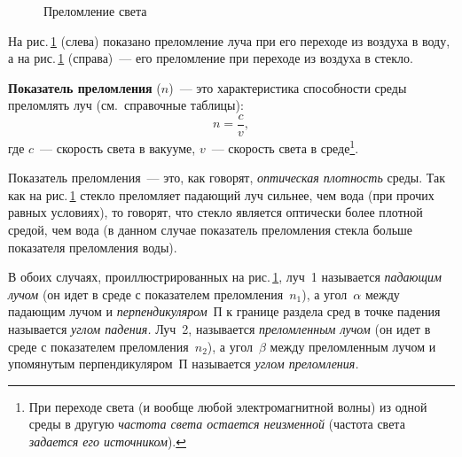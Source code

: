 \documentclass[main.tex]{subfiles}
\begin{document}
\begin{figure}[H]
\caption{Преломление света}
\label{fig:p178}
\end{figure}


На рис.\,\ref{fig:p178} (слева) показано преломление луча при его переходе из воздуха в воду, а на рис.\,\ref{fig:p178} (справа)~--- его преломление при переходе из воздуха в стекло. 

\textbf{Показатель преломления} ($n$)~--- это характеристика способности среды преломлять луч (см.~справочные таблицы):
\begin{equation}
    n=\frac{c}{v},
\end{equation}
где $c$~--- скорость света в вакууме, $v$~--- скорость света в среде\footnote{При переходе света (и вообще любой электромагнитной волны) из одной среды в другую \emph{частота света остается неизменной} (частота света \emph{задается его источником}).}.

Показатель преломления~--- это, как говорят, \emph{оптическая плотность} среды. Так как на рис.\,\ref{fig:p178} стекло преломляет падающий луч сильнее, чем вода (при прочих равных условиях), то говорят, что стекло является оптически более плотной средой, чем вода (в данном случае показатель преломления стекла больше показателя преломления воды).

В обоих случаях, проиллюстрированных на рис.\,\ref{fig:p178}, луч~1 называется \emph{падающим лучом} (он идет в среде с показателем преломления~$n_1$), а угол~$\alpha$ между падающим лучом и \emph{перпендикуляром}~П к границе раздела сред в точке падения называется \emph{углом падения.} Луч~2, называется \emph{преломленным лучом} (он идет в среде с показателем преломления~$n_2$), а угол~$\beta$ между преломленным лучом и упомянутым перпендикуляром~П называется \emph{углом преломления.}   
\end{document}
